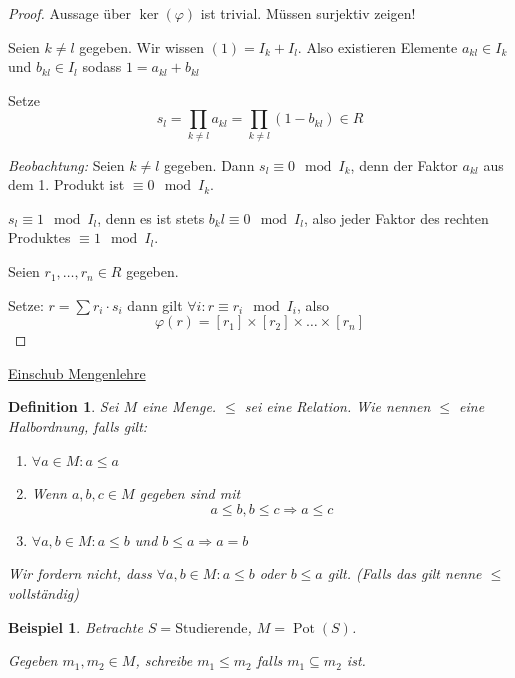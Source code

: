 \documentclass[a4paper,12pt,numbers=noenddot,parskip=full]{scrartcl}
\newcommand{\heading}{\underline}
\theoremstyle{dotless}
\newtheorem{definition}[theorem]{Definition}
\newtheorem{example}[theorem]{Beispiel}
\theoremstyle{remark}
\begin{document}
	\begin{proof}
		Aussage über $\ker(\varphi)$ ist trivial. Müssen surjektiv zeigen!
		
		Seien $k \neq l$ gegeben. Wir wissen $(1) = I_k + I_l$. Also existieren Elemente $a_{kl} \in I_k$ und $b_{kl} \in I_l$ sodass $1 = a_{kl} + b_{kl}$
		
		Setze
		\begin{equation*}
			s_l = \prod_{k \neq l} a_{kl} = \prod_{k \neq l} (1 - b_{kl}) \in R
		\end{equation*}
		
		\textit{Beobachtung:} Seien $k \neq l$ gegeben. Dann $s_l \equiv 0 \mod I_k$, denn der Faktor $a_{kl}$ aus dem 1. Produkt ist $\equiv 0 \mod I_k$.
		
		$s_l \equiv 1 \mod I_l$, denn es ist stets $b_kl \equiv 0 \mod I_l$, also jeder Faktor des rechten Produktes $\equiv 1 \mod I_l$.
		
		Seien $r_1, \dots, r_n \in R$ gegeben.
		
		Setze: $r = \sum r_i \cdot s_i$ dann gilt $\forall i: r \equiv r_i \mod I_i$, also
		\begin{equation*}
			\varphi(r) = [r_1] \times [r_2] \times \dots \times [r_n]
		\end{equation*}
	\end{proof}

	\heading{Einschub Mengenlehre}
	
	\begin{definition}
		Sei $M$ eine Menge. $\leq$ sei eine Relation. Wie nennen $\leq$ eine Halbordnung, falls gilt:
		\begin{enumerate}
			\item $\forall a \in M: a \leq a$
			\item Wenn $a,b,c \in M$ gegeben sind mit
			\begin{equation*}
				a \leq b, b \leq c \Rightarrow a \leq c
			\end{equation*}
			\item $\forall a,b \in M: a \leq b$ und $b \leq a \Rightarrow a = b$
		\end{enumerate}
		Wir fordern nicht, dass $\forall a,b \in M: a \leq b$ oder $b \leq a$ gilt. (Falls das gilt nenne $\leq$ vollständig)
	\end{definition}

	\begin{example}
		Betrachte $S = \text{Studierende}$, $M = \operatorname{Pot}(S)$.
		
		Gegeben $m_1, m_2 \in M$, schreibe $m_1 \leq m_2$ falls $m_1 \subseteq m_2$ ist.
	\end{example}
\end{document}
